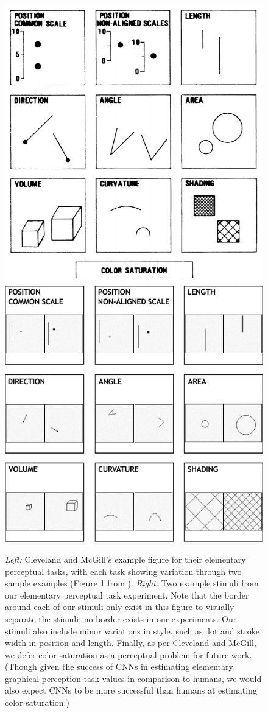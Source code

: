 \documentclass[journal]{vgtc}        %
\begin{document}
\begin{figure}[tb]
    \centering
    \includegraphics[width=0.49\linewidth]{./gfx/CMcG_Comparison/CMcG_ElementaryPerceptualTasks.png}
    \vrule
    \hspace{0.2cm}
    \includegraphics[width=0.465\linewidth,trim=0 -2.00cm 0 0, clip]{./gfx/CMcG_Comparison/Ours_ElementaryPerceptualTasks.pdf}
    \caption{\emph{Left:} Cleveland and McGill's example figure for their elementary perceptual tasks, with each task showing variation through two sample examples (Figure 1 from \cite{cleveland_mcgill}). \emph{Right:} Two example stimuli from our elementary perceptual task experiment. Note that the border around each of our stimuli only exist in this figure to visually separate the stimuli; no border exists in our experiments. Our stimuli also include minor variations in style, such as dot and stroke width in position and length. Finally, as per Cleveland and McGill, we defer color saturation as a perceptual problem for future work. (Though given the success of CNNs in estimating elementary graphical perception task values in comparison to humans, we would also expect CNNs to be more successful than humans at estimating color saturation.)}
    \label{fig:cmcg_elementary_comparison}
\end{figure}
\end{document}
